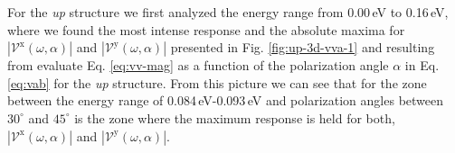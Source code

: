 \documentclass[prb,11pt,tightenlines,twocolumn,aps]{revtex4-1}
\begin{document}
For the \emph{up} structure we first analyzed the energy range from 0.00\,eV to
0.16\,eV, where we found the most intense response and the absolute maxima for
$|\mathcal{V}^{\mathrm{x}}(\omega,\alpha)|$ and
$|\mathcal{V}^{\mathrm{y}}(\omega,\alpha)|$ presented in Fig.
% 
\ref{fig:up-3d-vva-1} and resulting from evaluate Eq. \eqref{eq:vv-mag} as a
function of the polarization angle $\alpha$ in Eq. \eqref{eq:vab} for the
\emph{up} structure.
%
From this picture we can see that for the zone between the energy range of
0.084\,eV-0.093\,eV and polarization angles between $30^{\circ}$ and
$45^{\circ}$ is the zone where the maximum response is held for both,
$|\mathcal{V}^{\mathrm{x}}(\omega,\alpha)|$ and
$|\mathcal{V}^{\mathrm{y}}(\omega,\alpha)|$.
\end{document}
